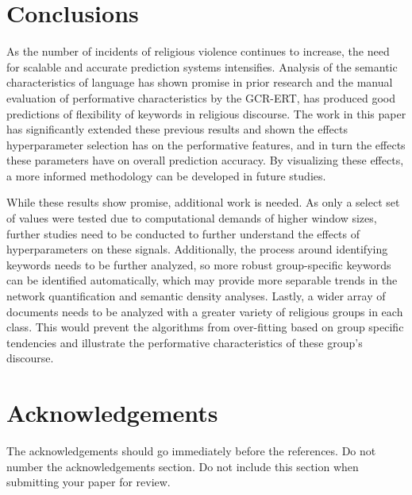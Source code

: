 \documentclass[11pt]{article}
\begin{document}
\section{Conclusions}
\label{conclusions}

As the number of incidents of religious violence continues to increase, the need for scalable and accurate prediction systems intensifies. Analysis of the semantic characteristics of language has shown promise in prior research and the manual evaluation of performative characteristics by the GCR-ERT, has produced good predictions of flexibility of keywords in religious discourse. The work in this paper has significantly extended these previous results and shown the effects hyperparameter selection has on the performative features, and in turn the effects these parameters have on overall prediction accuracy. By visualizing these effects, a more informed methodology can be developed in future studies. 

While these results show promise, additional work is needed. As only a select set of values were tested due to computational demands of higher window sizes, further studies need to be conducted to further understand the effects of hyperparameters on these signals. Additionally, the process around identifying keywords needs to be further analyzed, so more robust group-specific keywords can be identified automatically, which may provide more separable trends in the network quantification and semantic density analyses. Lastly, a wider array of documents needs to be analyzed with a greater variety of religious groups in each class. This would prevent the algorithms from over-fitting based on group specific tendencies and illustrate the performative characteristics of these group’s discourse.

\section*{Acknowledgements}

The acknowledgements should go immediately before the references.  Do
not number the acknowledgements section. Do not include this section
when submitting your paper for review.




\end{document}
